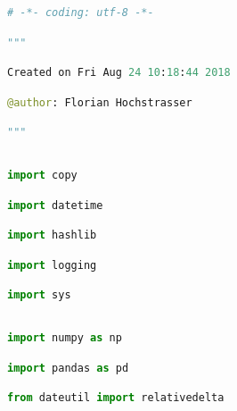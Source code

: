 \documentclass[
  11pt,
  a4paper,
  DIV=12,captions=tableheading,oneside]{scrbook}
\begin{document}
\begin{lstlisting}[language=Python,stepnumber=2,basicstyle=\footnotesize]
# -*- coding: utf-8 -*-\end{lstlisting}
\begin{lstlisting}[language=Python,stepnumber=2,basicstyle=\footnotesize]
"""\end{lstlisting}
\begin{lstlisting}[language=Python,stepnumber=2,basicstyle=\footnotesize]
Created on Fri Aug 24 10:18:44 2018\end{lstlisting}
\begin{lstlisting}[language=Python,stepnumber=2,basicstyle=\footnotesize]
@author: Florian Hochstrasser\end{lstlisting}
\begin{lstlisting}[language=Python,stepnumber=2,basicstyle=\footnotesize]
"""\end{lstlisting}
\begin{lstlisting}[language=Python,stepnumber=2,basicstyle=\footnotesize]
\end{lstlisting}
\begin{lstlisting}[language=Python,stepnumber=2,basicstyle=\footnotesize]
import copy\end{lstlisting}
\begin{lstlisting}[language=Python,stepnumber=2,basicstyle=\footnotesize]
import datetime\end{lstlisting}
\begin{lstlisting}[language=Python,stepnumber=2,basicstyle=\footnotesize]
import hashlib\end{lstlisting}
\begin{lstlisting}[language=Python,stepnumber=2,basicstyle=\footnotesize]
import logging\end{lstlisting}
\begin{lstlisting}[language=Python,stepnumber=2,basicstyle=\footnotesize]
import sys\end{lstlisting}
\begin{lstlisting}[language=Python,stepnumber=2,basicstyle=\footnotesize]
\end{lstlisting}
\begin{lstlisting}[language=Python,stepnumber=2,basicstyle=\footnotesize]
import numpy as np\end{lstlisting}
\begin{lstlisting}[language=Python,stepnumber=2,basicstyle=\footnotesize]
import pandas as pd\end{lstlisting}
\begin{lstlisting}[language=Python,stepnumber=2,basicstyle=\footnotesize]
from dateutil import relativedelta\end{lstlisting}
\end{document}
